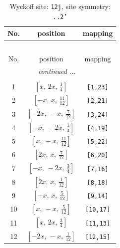 \documentclass[fleqn,8pt]{jsarticle}
\begin{document}
\begin{longtable}{ccc}
\caption{Wyckoff site: {\tt 12j}, site symmetry: {\tt ..2'}}
 \\
 \hline \hline
No. & position & mapping \\ \hline \endfirsthead

\multicolumn{2}{l}{\tablename\ \thetable{}} \\
 \hline \hline
No. & position & mapping \\ \hline \endhead

 \hline \hline
\multicolumn{2}{r}{\footnotesize\it continued ...} \\ \endfoot

 \hline \hline
\multicolumn{2}{r}{} \\ \endlastfoot

1 & $\left[ x,\, 2 x,\, \frac{1}{4} \right]$ & {\tt [1,23]} \\ \hline
2 & $\left[ - x,\, x,\, \frac{11}{12} \right]$ & {\tt [2,21]} \\ \hline
3 & $\left[ - 2 x,\, - x,\, \frac{7}{12} \right]$ & {\tt [3,24]} \\ \hline
4 & $\left[ - x,\, - 2 x,\, \frac{1}{4} \right]$ & {\tt [4,19]} \\ \hline
5 & $\left[ x,\, - x,\, \frac{11}{12} \right]$ & {\tt [5,22]} \\ \hline
6 & $\left[ 2 x,\, x,\, \frac{7}{12} \right]$ & {\tt [6,20]} \\ \hline
7 & $\left[ - x,\, - 2 x,\, \frac{3}{4} \right]$ & {\tt [7,16]} \\ \hline
8 & $\left[ 2 x,\, x,\, \frac{1}{12} \right]$ & {\tt [8,18]} \\ \hline
9 & $\left[ - x,\, x,\, \frac{5}{12} \right]$ & {\tt [9,14]} \\ \hline
10 & $\left[ x,\, - x,\, \frac{5}{12} \right]$ & {\tt [10,17]} \\ \hline
11 & $\left[ x,\, 2 x,\, \frac{3}{4} \right]$ & {\tt [11,13]} \\ \hline
12 & $\left[ - 2 x,\, - x,\, \frac{1}{12} \right]$ & {\tt [12,15]} \\
\end{longtable}
\renewcommand{\arraystretch}{1.2}
\end{document}
